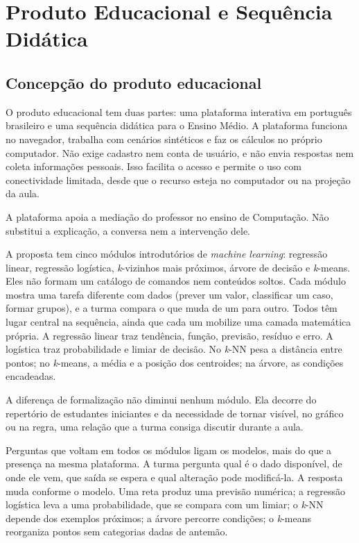 \chapter{Produto Educacional e Sequência Didática}

\section{Concepção do produto educacional}

O produto educacional tem duas partes: uma plataforma interativa em português brasileiro e uma sequência didática para o Ensino Médio. A plataforma funciona no navegador, trabalha com cenários sintéticos e faz os cálculos no próprio computador. Não exige cadastro nem conta de usuário, e não envia respostas nem coleta informações pessoais. Isso facilita o acesso e permite o uso com conectividade limitada, desde que o recurso esteja no computador ou na projeção da aula.

A plataforma apoia a mediação do professor no ensino de Computação. Não substitui a explicação, a conversa nem a intervenção dele.

A proposta tem cinco módulos introdutórios de \textit{machine learning}: regressão linear, regressão logística, \textit{k}-vizinhos mais próximos, árvore de decisão e \textit{k}-means. Eles não formam um catálogo de comandos nem conteúdos soltos. Cada módulo mostra uma tarefa diferente com dados (prever um valor, classificar um caso, formar grupos), e a turma compara o que muda de um para outro. Todos têm lugar central na sequência, ainda que cada um mobilize uma camada matemática própria. A regressão linear traz tendência, função, previsão, resíduo e erro. A logística traz probabilidade e limiar de decisão. No \textit{k}-NN pesa a distância entre pontos; no \textit{k}-means, a média e a posição dos centroides; na árvore, as condições encadeadas.

A diferença de formalização não diminui nenhum módulo. Ela decorre do repertório de estudantes iniciantes e da necessidade de tornar visível, no gráfico ou na regra, uma relação que a turma consiga discutir durante a aula.

Perguntas que voltam em todos os módulos ligam os modelos, mais do que a presença na mesma plataforma. A turma pergunta qual é o dado disponível, de onde ele vem, que saída se espera e qual alteração pode modificá-la. A resposta muda conforme o modelo. Uma reta produz uma previsão numérica; a regressão logística leva a uma probabilidade, que se compara com um limiar; o \textit{k}-NN depende dos exemplos próximos; a árvore percorre condições; o \textit{k}-means reorganiza pontos sem categorias dadas de antemão.

